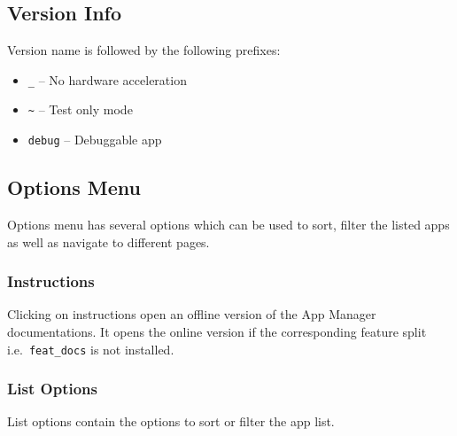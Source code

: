 \subsection{Version Info}\label{subsec:main-page-version-info}
Version name is followed by the following prefixes:
\begin{itemize}
    \item \texttt{\_} -- No hardware acceleration
    \item \texttt{\textasciitilde} -- Test only mode
    \item \texttt{debug} -- Debuggable app
\end{itemize}

\subsection{Options Menu}\label{subsec:main-page-options-menu}
Options menu has several options which can be used to sort, filter the listed apps as well as navigate to different pages.

\subsubsection{Instructions}
Clicking on instructions open an offline version of the App Manager documentations. It opens the online version if the
corresponding feature split i.e.\ \texttt{feat\_docs} is not installed.

\subsubsection{List Options}
List options contain the options to sort or filter the app list.

